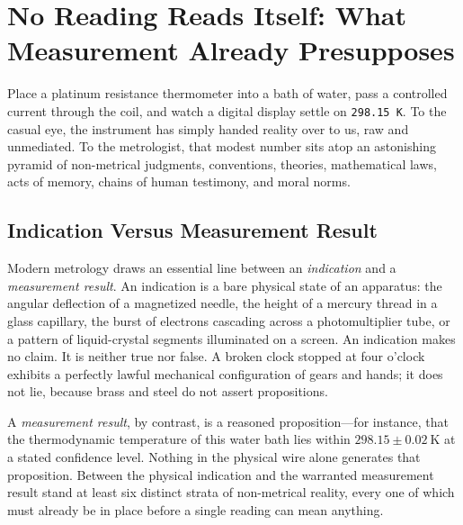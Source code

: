 \section{No Reading Reads Itself: What Measurement Already Presupposes}

Place a platinum resistance thermometer into a bath of water, pass a controlled current through the coil, and watch a digital display settle on \texttt{298.15 K}. To the casual eye, the instrument has simply handed reality over to us, raw and unmediated. To the metrologist, that modest number sits atop an astonishing pyramid of non-metrical judgments, conventions, theories, mathematical laws, acts of memory, chains of human testimony, and moral norms.

\subsection{Indication Versus Measurement Result}

Modern metrology draws an essential line between an \emph{indication} and a \emph{measurement result}. An indication is a bare physical state of an apparatus: the angular deflection of a magnetized needle, the height of a mercury thread in a glass capillary, the burst of electrons cascading across a photomultiplier tube, or a pattern of liquid-crystal segments illuminated on a screen. An indication makes no claim. It is neither true nor false. A broken clock stopped at four o'clock exhibits a perfectly lawful mechanical configuration of gears and hands; it does not lie, because brass and steel do not assert propositions.

A \emph{measurement result}, by contrast, is a reasoned proposition---for instance, that the thermodynamic temperature of this water bath lies within $298.15 \pm 0.02~\mathrm{K}$ at a stated confidence level. Nothing in the physical wire alone generates that proposition. Between the physical indication and the warranted measurement result stand at least six distinct strata of non-metrical reality, every one of which must already be in place before a single reading can mean anything.

